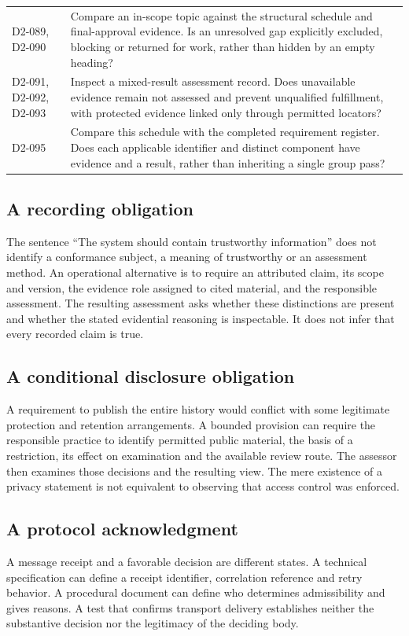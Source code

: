 \documentclass[11pt,a4paper]{article}
\begin{document}
\begin{longtable}{L{0.26\textwidth}L{0.64\textwidth}}
D2-089, D2-090 & Compare an in-scope topic against the structural schedule and final-approval evidence. Is an unresolved gap explicitly excluded, blocking or returned for work, rather than hidden by an empty heading?\\
D2-091, D2-092, D2-093 & Inspect a mixed-result assessment record. Does unavailable evidence remain not assessed and prevent unqualified fulfillment, with protected evidence linked only through permitted locators?\\
D2-095 & Compare this schedule with the completed requirement register. Does each applicable identifier and distinct component have evidence and a result, rather than inheriting a single group pass?\\
\bottomrule
\end{longtable}
\endgroup

\subsection{A recording obligation}
The sentence ``The system should contain trustworthy information'' does not identify a conformance subject, a meaning of trustworthy or an assessment method. An operational alternative is to require an attributed claim, its scope and version, the evidence role assigned to cited material, and the responsible assessment. The resulting assessment asks whether these distinctions are present and whether the stated evidential reasoning is inspectable. It does not infer that every recorded claim is true.

\subsection{A conditional disclosure obligation}
A requirement to publish the entire history would conflict with some legitimate protection and retention arrangements. A bounded provision can require the responsible practice to identify permitted public material, the basis of a restriction, its effect on examination and the available review route. The assessor then examines those decisions and the resulting view. The mere existence of a privacy statement is not equivalent to observing that access control was enforced.

\subsection{A protocol acknowledgment}
A message receipt and a favorable decision are different states. A technical specification can define a receipt identifier, correlation reference and retry behavior. A procedural document can define who determines admissibility and gives reasons. A test that confirms transport delivery establishes neither the substantive decision nor the legitimacy of the deciding body.
\end{document}
